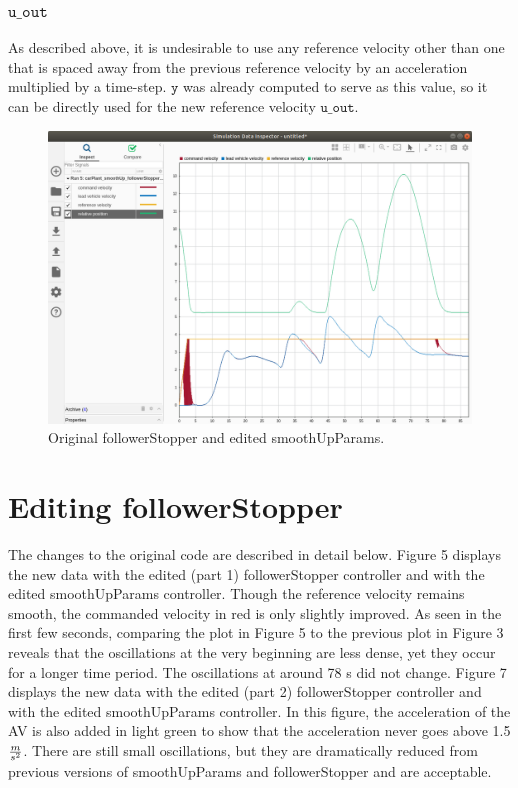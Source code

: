 \documentclass[12pt, letterpaper]{article}
\begin{document}
\subsubsection{$\mathtt{u\_out}$}
As described above, it is undesirable to use any reference velocity other than one that is spaced away from the previous reference velocity by an acceleration multiplied by a time-step. $\mathtt{y}$ was already computed to serve as this value, so it can be directly used for the new reference velocity $\mathtt{u\_out}$.

\begin{figure}[h!]
\begin{center}
\includegraphics[width=6in]{originalFS_editedSUP_1}
\caption{Original followerStopper and edited smoothUpParams.}
\label{default}
\end{center}
\end{figure}


\section{Editing followerStopper}
The changes to the original code are described in detail below. Figure 5 displays the new data with the edited (part 1) followerStopper controller and with the edited smoothUpParams controller. Though the reference velocity remains smooth, the commanded velocity in red is only slightly improved. As seen in the first few seconds, comparing the plot in Figure 5 to the previous plot in Figure 3 reveals that the oscillations at the very beginning are less dense, yet they occur for a longer time period. The oscillations at around 78 s did not change.  Figure 7 displays the new data with the edited (part 2) followerStopper controller and with the edited smoothUpParams controller. In this figure, the acceleration of the AV is also added in light green to show that the acceleration never goes above 1.5 $m\over s^2$. There are still small oscillations, but they are dramatically reduced from previous versions of smoothUpParams and followerStopper and are acceptable.
\end{document}
